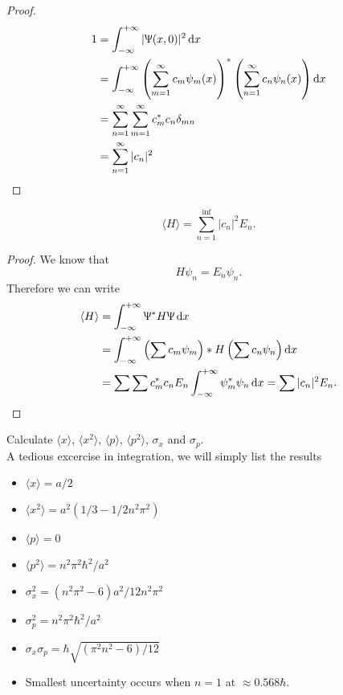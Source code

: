 \begin{proof}
\begin{subequations}
\begin{align}
1&=\intinf|\ups(x,0)|^2\dx\\
&=\intinf\left(\sum_{m=1}^{\inf}c_m\psi_m(x) \right)^*\left(\sum_{n=1}^{\inf}c_n\psi_n(x) \right)\dx\\
&=\sum_{n=1}^{\inf}\sum_{m=1}^{\inf}c_m^*c_n\delta_{mn}\\
&=\sum_{n=1}^{\inf}|c_n|^2
\end{align}
\end{subequations}
\end{proof}
\begin{thrm}
\begin{equation}
\langle H\rangle=\sum_{n=1}^{\inf}|c_n|^2E_n.
\end{equation}
\end{thrm}
\begin{proof}
We know that
\begin{equation}
 H\psi_n=E_n\psi_n.
\end{equation}
Therefore we can write
\begin{subequations}
\begin{align}
\langle H\rangle&=\intinf\ups^*H\ups\dx\\
&=\intinf\left(\sum c_m\psi_m \right)*H\left(\sum c_n\psi_n \right)\dx\\
&=\sum\sum c_m^*c_nE_n\intinf\psi_m^*\psi_n\dx=\sum|c_n|^2E_n.
\end{align}
\end{subequations}
\end{proof}
\begin{wex}	
Calculate $\langle x \rangle$, $\langle x^2 \rangle$, $\langle p \rangle$, $\langle p^2 \rangle$, $\sigma_x$ and $\sigma_p$.
\ \\
A tedious excercise in integration, we will simply list the results
\begin{itemize}
\item $\langle x \rangle=a/2$
\item $\langle x^2 \rangle=a^2(1/3-1/2n^2\pi^2)$
\item $\langle p \rangle=0$
\item $\langle p^2 \rangle=n^2\pi^2\hbar^2/a^2$
\item $\sigma_x^2=(n^2\pi^2-6)a^2/12n^2\pi^2$
\item $\sigma_p^2=n^2\pi^2\hbar^2/a^2$
\item $\sigma_x\sigma_p=\hbar\sqrt{(\pi^2n^2-6)/12}$
\item Smallest uncertainty occurs when $n=1$ at $\approx0.568\hbar$. 
\end{itemize}
\end{wex}
